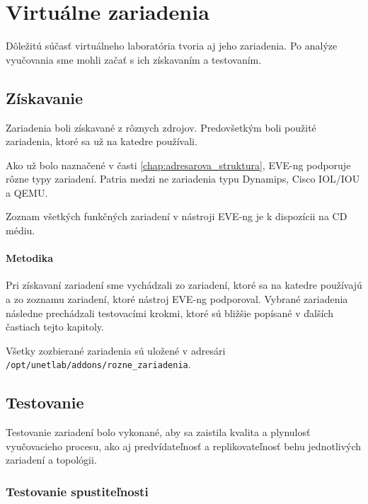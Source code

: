 \chapter{Virtuálne zariadenia}
\label{chap:virt_zariadenia}

Dôležitú súčasť virtuálneho laboratória tvoria aj jeho zariadenia. Po analýze vyučovania sme mohli začať s ich získavaním a testovaním.




\section{Získavanie}

Zariadenia boli získavané z rôznych zdrojov. Predovšetkým boli použité zariadenia, ktoré sa už na katedre používali.

Ako už bolo naznačené v časti \ref{chap:adresarova_struktura}, EVE-ng podporuje rôzne typy zariadení. Patria medzi ne zariadenia typu Dynamips, Cisco IOL/IOU a QEMU.

Zoznam všetkých funkčných zariadení v nástroji EVE-ng je k dispozícii na CD médiu.




\subsubsection{Metodika}

Pri získavaní zariadení sme vychádzali zo zariadení, ktoré sa na katedre používajú a zo zoznamu zariadení, ktoré nástroj EVE-ng podporoval. Vybrané zariadenia následne prechádzali testovacími krokmi, ktoré sú bližšie popísané v ďalších častiach tejto kapitoly.

Všetky zozbierané zariadenia sú uložené v adresári \\ \texttt{/opt/unetlab/addons/rozne\_zariadenia}.




\section{Testovanie}
\label{chap:testovanie_zariadeni}

Testovanie zariadení bolo vykonané, aby sa zaistila kvalita a plynulosť vyučovacieho procesu, ako aj predvídateľnosť a replikovateľnosť behu jednotlivých zariadení a topológii.




\subsection{Testovanie spustiteľnosti}

